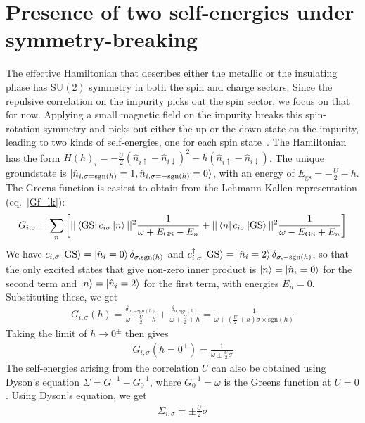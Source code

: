 \documentclass{report}
\numberwithin{equation}{section}
\begin{document}
\section{Presence of two self-energies under symmetry-breaking}
The effective Hamiltonian that describes either the metallic or the insulating phase has $\mathrm{SU}(2)$ symmetry in both the spin and charge sectors. Since the repulsive correlation on the impurity picks out the spin sector, we focus on that for now. Applying a small magnetic field on the impurity breaks this spin-rotation symmetry and picks out either the up or the down state on the impurity, leading to two kinds of self-energies, one for each spin state~\cite{logan_2014,Logan_2015}. The Hamiltonian has the form \(H(h)_i = -\frac{U}{2}\left(\hat n_{i \uparrow} - \hat n_{i \downarrow}\right)^2 - h\left(\hat n_{i \uparrow} - \hat n_{i \downarrow}\right)\). The unique groundstate is \(\ket{\hat n_{i,\sigma = \text{sgn}(h)}=1,\hat n_{i,\sigma = -\text{sgn}(h)}=0}\), with an energy of \(E_\text{gs} = -\frac{U}{2} - h\). The Greens function is easiest to obtain from the Lehmann-Kallen representation (eq.~\ref{Gf_lk}):
\begin{equation}\begin{aligned}
	G_{i,\sigma} = \sum_{n}\left[||\bra{\text{GS}}c_{i\sigma}\ket{n}||^2\frac{1}{\omega + E_\text{GS} - E_n} + ||\bra{n}c_{i\sigma}\ket{\text{GS}}||^2\frac{1}{\omega - E_\text{GS} + E_n}\right]\\
\end{aligned}\end{equation}
We have \(c_{i,\sigma}\ket{\text{GS}} = \ket{\hat n_i = 0}\delta_{\sigma,\text{sgn}(h)}\) and \(c^\dagger_{i,\sigma}\ket{\text{GS}} = \ket{\hat n_i = 2}\delta_{\sigma,-\text{sgn}(h)}\), so that the only excited states that give non-zero inner product is \(\ket{n}=\ket{\hat n_i = 0}\) for the second term and \(\ket{n}=\ket{\hat n_i=2}\) for the first term, with energies \(E_n=0\). Substituting these, we get
\begin{equation}\begin{aligned}
	G_{i,\sigma}(h) = \frac{\delta_{\sigma,-\text{sgn}(h)}}{\omega - \frac{U}{2} - h} + \frac{\delta_{\sigma,\text{sgn}(h)}}{\omega + \frac{U}{2} + h} = \frac{1}{\omega + \left(\frac{U}{2}+h\right)\sigma \times \text{sgn}(h) }
\end{aligned}\end{equation}
Taking the limit of \(h \to 0^\pm\) then gives
\begin{equation}\begin{aligned}
	G_{i,\sigma}(h=0^\pm) = \frac{1}{\omega \pm \frac{U}{2}\sigma}
\end{aligned}\end{equation}
The self-energies arising from the correlation \(U\) can also be obtained using Dyson's equation \(\Sigma = G^{-1} - G_0^{-1}\), where \(G_0^{-1} = \omega\) is the Greens function at \(U=0\). Using Dyson's equation, we get
\begin{equation}\begin{aligned}
	\Sigma_{i,\sigma} = \pm\frac{U}{2}\sigma
\end{aligned}\end{equation}
\end{document}
